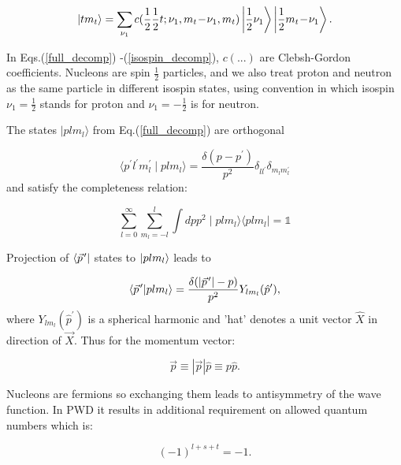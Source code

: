     \begin{equation}
        \ket{t m_t} = \sum_{\nu_1} c(\frac{1}{2}\frac{1}{2}t;\nu_1, m_t\!-\!\nu_1, m_t)
        \ket{\frac{1}{2} \nu_1}
        \ket{\frac{1}{2} m_t\!-\!\nu_1}.
        \label{isospin_decomp}
    \end{equation}

    In Eqs.(\ref{full_decomp}) -(\ref{isospin_decomp}),  $c(...)$ are Clebsh-Gordon coefficients.
    Nucleons are spin $\frac{1}{2}$ particles, and we also treat proton and neutron as 
    the same particle in different 
    isospin states, using convention in which isospin $\nu_1 = \frac{1}{2}$ stands for proton and $\nu_1 = -\frac{1}{2}$ is for neutron.

    The states $\mid p l m_l \rangle$ from Eq.(\ref{full_decomp}) are orthogonal
    
    \begin{equation}
        \langle p^\prime l^\prime m_l^\prime \mid p l m_l \rangle = 
        \frac{\delta(p - p^\prime)}{p^2} \delta_{ll^\prime}\delta_{m_l m_l^\prime}
    \end{equation}
    and satisfy the completeness relation:

    \begin{equation}
        \sum_{l=0}^\infty \sum_{m_l=-l}^l \int dp p^2 \mid plm_l \rangle \langle plm_l \mid = \mathbb{1}
    \end{equation}


    Projection of $\bra{\pvec{p}}$ states to $\ket{plm_l}$ leads to

    \begin{equation}
        \braket{\pvec{p}}{plm_l} = 
        \frac{\delta ( \abs{\pvec{p}} - p)}{p^2} Y _{l m_l}(\hat{p}^\prime),
    \end{equation}
    where $Y _{l m_l}(\hat{p}^\prime)$ is a spherical harmonic and 'hat' denotes a unit vector $\hat{X}$ in 
    direction of $\vec{X}$. Thus for the momentum vector:

    \begin{equation}
        \vec{p} \equiv |\vec{p}| \hat{p} \equiv p \hat{p}. 
        \label{hat}
    \end{equation}

    Nucleons are fermions so exchanging them leads to antisymmetry of the
    wave function. In PWD it results in additional requirement on allowed quantum numbers which
    is:

    \begin{equation}
        (-1)^{l+s+t} = -1.
        \label{parity}
    \end{equation}


